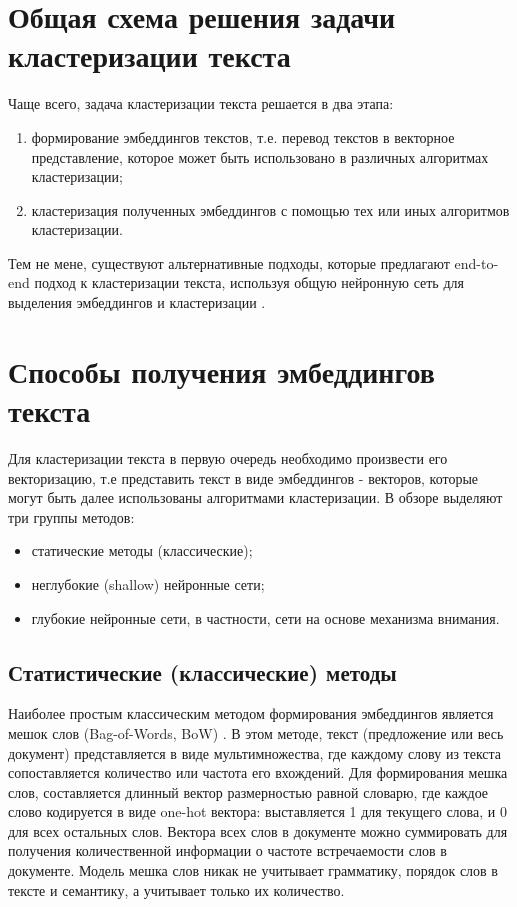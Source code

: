 \section{Общая схема решения задачи кластеризации текста}

Чаще всего, задача кластеризации текста решается в два этапа:
\begin{enumerate}
    \item формирование эмбеддингов текстов, т.е. перевод текстов в векторное представление, которое может быть использовано в различных алгоритмах кластеризации;
    \item кластеризация полученных эмбеддингов с помощью тех или иных алгоритмов кластеризации.
\end{enumerate}

Тем не мене, существуют альтернативные подходы, которые предлагают end-to-end подход к кластеризации текста, используя общую нейронную сеть для выделения эмбеддингов и кластеризации \cite{end-to-end-clustering}.

\section{Способы получения эмбеддингов текста}

Для кластеризации текста в первую очередь необходимо произвести его векторизацию, т.е представить текст в виде эмбеддингов - векторов, которые могут быть далее использованы алгоритмами кластеризации. В обзоре \cite{no-patterns} выделяют три группы методов:
\begin{itemize}
    \item статические методы (классические);
    \item неглубокие (shallow) нейронные сети;
    \item глубокие нейронные сети, в частности, сети на основе механизма внимания.
\end{itemize}

\subsection{Статистические (классические) методы}

Наиболее простым классическим методом формирования эмбеддингов является мешок слов (Bag-of-Words, BoW) \cite{bagofwords}. В этом методе, текст (предложение или весь документ) представляется в виде мультимножества, где каждому слову из текста сопоставляется количество или частота его вхождений. Для формирования мешка слов, составляется длинный вектор размерностью равной словарю, где каждое слово кодируется в виде one-hot вектора: выставляется 1 для текущего слова, и 0 для всех остальных слов. Вектора всех слов в документе можно суммировать для получения количественной информации о частоте встречаемости слов в документе. Модель мешка слов никак не учитывает грамматику, порядок слов в тексте и семантику, а учитывает только их количество.

